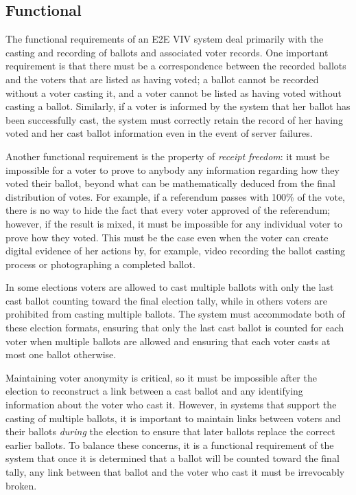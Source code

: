 \subsection{Functional} 
  The functional requirements of an E2E VIV
system deal primarily with the casting and recording of ballots and
associated voter records. One important requirement is that there must
be a correspondence between the recorded ballots and the voters that
are listed as having voted; a ballot cannot be recorded without a
voter casting it, and a voter cannot be listed as having voted without
casting a ballot. Similarly, if a voter is informed by the system that
her ballot has been successfully cast, the system must correctly
retain the record of her having voted and her cast ballot information
even in the event of server failures.

Another functional requirement is the property of \emph{receipt
  freedom}: it must be impossible for a voter to prove to anybody any
information regarding how they voted their ballot, beyond what can be
mathematically deduced from the final distribution of votes. For
example, if a referendum passes with 100\% of the vote, there is no
way to hide the fact that every voter approved of the referendum;
however, if the result is mixed, it must be impossible for any
individual voter to prove how they voted. This must be the case even
when the voter can create digital evidence of her actions by, for
example, video recording the ballot casting process or photographing a
completed ballot.

In some elections voters are allowed to cast multiple ballots with
only the last cast ballot counting toward the final election tally,
while in others voters are prohibited from casting multiple
ballots. The system must accommodate both of these election formats,
ensuring that only the last cast ballot is counted for each voter when
multiple ballots are allowed and ensuring that each voter casts at
most one ballot otherwise.

Maintaining voter anonymity is critical, so it must be impossible
after the election to reconstruct a link between a cast ballot and any
identifying information about the voter who cast it. However, in
systems that support the casting of multiple ballots, it is important
to maintain links between voters and their ballots \emph{during} the
election to ensure that later ballots replace the correct earlier
ballots. To balance these concerns, it is a functional requirement of
the system that once it is determined that a ballot will be counted
toward the final tally, any link between that ballot and the voter who
cast it must be irrevocably broken.

